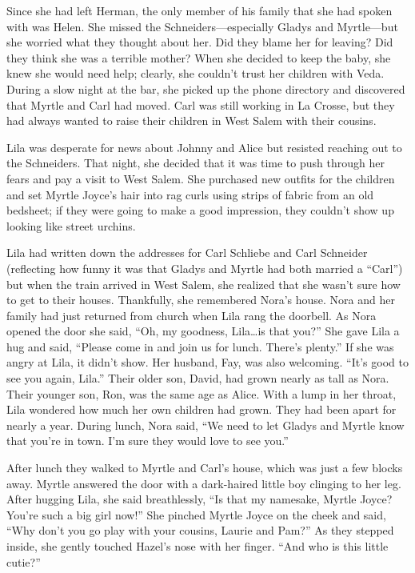 \documentclass[
  letterpaper,
]{book}
\begin{document}
Since she had left Herman, the only member of his family that she had
spoken with was Helen. She missed the Schneiders---especially Gladys and
Myrtle---but she worried what they thought about her. Did they blame her
for leaving? Did they think she was a terrible mother? When she decided
to keep the baby, she knew she would need help; clearly, she couldn't
trust her children with Veda. During a slow night at the bar, she picked
up the phone directory and discovered that Myrtle and Carl had moved.
Carl was still working in La Crosse, but they had always wanted to raise
their children in West Salem with their cousins.

Lila was desperate for news about Johnny and Alice but resisted reaching
out to the Schneiders. That night, she decided that it was time to push
through her fears and pay a visit to West Salem. She purchased new
outfits for the children and set Myrtle Joyce's hair into rag curls
using strips of fabric from an old bedsheet; if they were going to make
a good impression, they couldn't show up looking like street urchins.

Lila had written down the addresses for Carl Schliebe and Carl Schneider
(reflecting how funny it was that Gladys and Myrtle had both married a
``Carl'') but when the train arrived in West Salem, she realized that
she wasn't sure how to get to their houses. Thankfully, she remembered
Nora's house. Nora and her family had just returned from church when
Lila rang the doorbell. As Nora opened the door she said, ``Oh, my
goodness, Lila\ldots is that you?'' She gave Lila a hug and said,
``Please come in and join us for lunch. There's plenty.'' If she was
angry at Lila, it didn't show. Her husband, Fay, was also welcoming.
``It's good to see you again, Lila.'' Their older son, David, had grown
nearly as tall as Nora. Their younger son, Ron, was the same age as
Alice. With a lump in her throat, Lila wondered how much her own
children had grown. They had been apart for nearly a year. During lunch,
Nora said, ``We need to let Gladys and Myrtle know that you're in town.
I'm sure they would love to see you.''

After lunch they walked to Myrtle and Carl's house, which was just a few
blocks away. Myrtle answered the door with a dark-haired little boy
clinging to her leg. After hugging Lila, she said breathlessly, ``Is
that my namesake, Myrtle Joyce? You're such a big girl now!'' She
pinched Myrtle Joyce on the cheek and said, ``Why don't you go play with
your cousins, Laurie and Pam?'' As they stepped inside, she gently
touched Hazel's nose with her finger. ``And who is this little cutie?''
\end{document}
